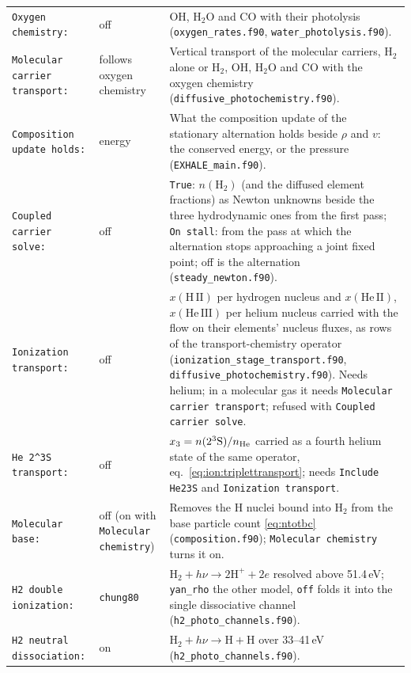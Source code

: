 {\begin{longtable}{@{}>{\raggedright\arraybackslash}p{}>{\raggedright\arraybackslash}p{}>{\raggedright\arraybackslash}p{}@{}}
\texttt{Oxygen chemistry:} & off &
  OH, $\mathrm{H_2O}$ and CO with their photolysis
  (\texttt{oxygen\_rates.f90}, \texttt{water\_photolysis.f90}). \\
\texttt{Molecular carrier transport:} & follows oxygen chemistry &
  Vertical transport of the molecular carriers, H$_2$ alone or H$_2$, OH,
  H$_2$O and CO with the oxygen chemistry
  (\texttt{diffusive\_photochemistry.f90}). \\
\texttt{Composition update holds:} & energy &
  What the composition update of the stationary alternation holds beside
  $\rho$ and $v$: the conserved energy, or the pressure
  (\texttt{EXHALE\_main.f90}). \\
\texttt{Coupled carrier solve:} & off &
  \texttt{True}: $n(\mathrm{H_2})$ (and the diffused element fractions) as
  Newton unknowns beside the three hydrodynamic ones from the first pass;
  \texttt{On stall}: from the pass at which the alternation stops
  approaching a joint fixed point; off is the alternation
  (\texttt{steady\_newton.f90}). \\
\texttt{Ionization transport:} & off &
  $x(\mathrm{H\,II})$ per hydrogen nucleus and $x(\mathrm{He\,II})$,
  $x(\mathrm{He\,III})$ per helium nucleus carried with the flow on their
  elements' nucleus fluxes, as rows of the transport-chemistry operator
  (\texttt{ionization\_stage\_transport.f90},
  \texttt{diffusive\_photochemistry.f90}).  Needs helium; in a molecular gas
  it needs \texttt{Molecular carrier transport}; refused with
  \texttt{Coupled carrier solve}. \\
\texttt{He 2\^{}3S transport:} & off &
  $x_3=n(2^3{\rm S})/n_{\rm He}$ carried as a fourth helium state of the same
  operator, eq.~\eqref{eq:ion:triplettransport}; needs
  \texttt{Include He23S} and \texttt{Ionization transport}. \\
\texttt{Molecular base:} & off (on with \texttt{Molecular chemistry}) &
  Removes the H nuclei bound into $\mathrm{H}_2$ from the base particle count
  \eqref{eq:ntotbc} (\texttt{composition.f90}); \texttt{Molecular
  chemistry} turns it on. \\
\texttt{H2 double ionization:} & \texttt{chung80} &
  $\mathrm{H_2} + h\nu \to 2\mathrm{H^+} + 2e$ resolved above 51.4\,eV;
  \texttt{yan\_rho} the other model, \texttt{off} folds it into the single
  dissociative channel (\texttt{h2\_photo\_channels.f90}). \\
\texttt{H2 neutral dissociation:} & on &
  $\mathrm{H_2} + h\nu \to \mathrm{H} + \mathrm{H}$ over 33--41\,eV
  (\texttt{h2\_photo\_channels.f90}). \\

\end{longtable}}
